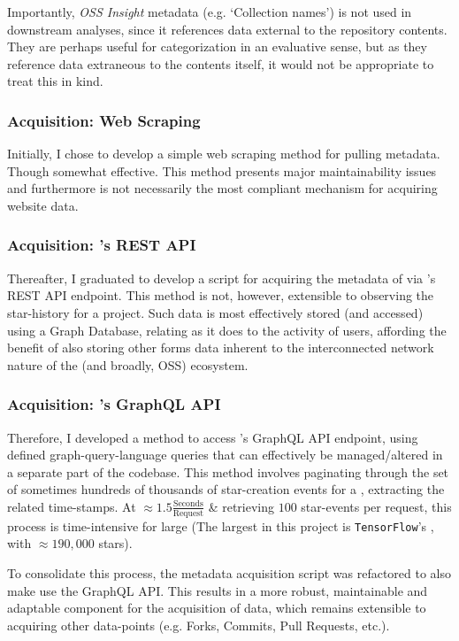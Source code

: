 Importantly, \emph{OSS Insight} metadata (e.g. ‘Collection names’) is not used in downstream analyses, since it references data external to the repository contents. They are perhaps useful for categorization in an evaluative sense, but as they reference data extraneous to the \repo{} contents itself, it would not be appropriate to treat this in kind.

\subsubsection{Acquisition: Web Scraping}
Initially, I chose to develop a simple web scraping method for pulling \repo{} metadata.
Though somewhat effective. This method presents major maintainability issues and furthermore is not necessarily the most compliant mechanism for acquiring website data.

\subsubsection{Acquisition: \gh{}'s REST API}
Thereafter, I graduated to develop a script for acquiring the metadata of \ghrepos{} via \gh{}'s REST API endpoint.
This method is not, however, extensible to observing the star-history for a project. Such data is most effectively stored (and accessed) using a Graph Database, relating as it does to the activity of users, affording the benefit of also storing other forms data inherent to the interconnected network nature of the \gh{} (and broadly, OSS) ecosystem.

\subsubsection{Acquisition: \gh{}'s GraphQL API}
Therefore, I developed a method to access \gh{}'s GraphQL API endpoint, using defined graph-query-language queries that can effectively be managed/altered in a separate part of the codebase.
This method involves paginating through the set of sometimes hundreds of thousands of star-creation events for a \repo{}, extracting the related time-stamps. At $\approx1.5\frac{\text{Seconds}}{\text{Request}}$ \& retrieving $100$ star-events per request, this process is time-intensive for large \repos{} (The largest in this project is \texttt{TensorFlow}'s \repo{}, with $\approx 190,000$ stars).

To consolidate this process, the metadata acquisition script was refactored to also make use the GraphQL API.
This results in a more robust, maintainable and adaptable component for the acquisition of \ghrepo{} data, which remains extensible to acquiring other data-points (e.g. Forks, Commits, Pull Requests, etc.).

